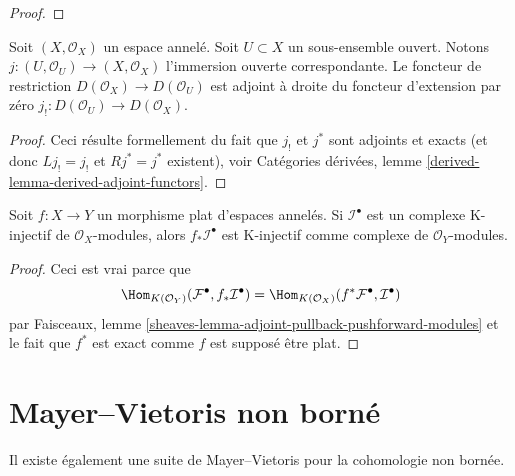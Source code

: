 {\begin{proof}
\end{proof}

\begin{lemma}

\label{lemma-adjoint-lower-shriek-restrict}
Soit $(X, \mathcal{O}_X)$ un espace annelé. Soit $U \subset X$ un sous-ensemble ouvert. Notons $j : (U, \mathcal{O}_U) \to (X, \mathcal{O}_X)$ l'immersion ouverte correspondante. Le foncteur de restriction $D(\mathcal{O}_X) \to D(\mathcal{O}_U)$ est adjoint à droite du foncteur d'extension par zéro $j_! : D(\mathcal{O}_U) \to D(\mathcal{O}_X)$.
\end{lemma}

\begin{proof}
Ceci résulte formellement du fait que $j_!$ et $j^*$ sont adjoints et exacts (et donc $Lj_! = j_!$ et $Rj^* = j^*$ existent), voir Catégories dérivées, lemme \ref{derived-lemma-derived-adjoint-functors}.
\end{proof}

\begin{lemma}

\label{lemma-K-injective-flat}

Soit $f : X \to Y$ un morphisme plat d'espaces annelés. Si $\mathcal{I}^\bullet$ est un complexe K-injectif de $\mathcal{O}_X$-modules, alors $f_*\mathcal{I}^\bullet$ est K-injectif comme complexe de
$\mathcal{O}_Y$-modules.

\end{lemma}

\begin{proof}
Ceci est vrai parce que $$
\Hom_{K(\mathcal{O}_Y)}(\mathcal{F}^\bullet, f_*\mathcal{I}^\bullet)
=
\Hom_{K(\mathcal{O}_X)}(f^*\mathcal{F}^\bullet, \mathcal{I}^\bullet)
$$ par Faisceaux, lemme \ref{sheaves-lemma-adjoint-pullback-pushforward-modules} et le fait que $f^*$ est exact comme $f$ est supposé être plat.
\end{proof}





\section{Mayer--Vietoris non borné}

\label{section-unbounded-mayer-vietoris}

\noindent
Il existe également une suite de Mayer--Vietoris pour la cohomologie non bornée.

\begin{lemma}


\end{lemma}}
